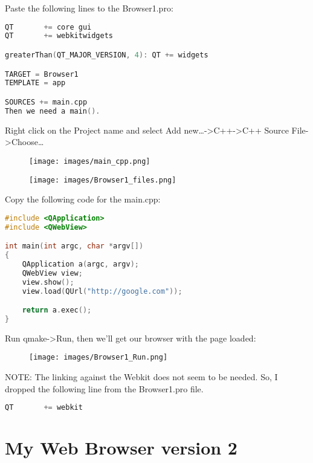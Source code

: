 Paste the following lines to the Browser1.pro:

\begin{lstlisting}[language=c++, numbers=none]
QT       += core gui
QT       += webkitwidgets

greaterThan(QT_MAJOR_VERSION, 4): QT += widgets

TARGET = Browser1
TEMPLATE = app

SOURCES += main.cpp
Then we need a main().
\end{lstlisting}

Right click on the Project name and select Add
new\ldots{}-\textgreater{}C++-\textgreater{}C++ Source
File-\textgreater{}Choose\ldots{}

\begin{figure}[htbp]
\centering
\texttt{[image: images/main\_cpp.png]}
\caption{}
\end{figure}

\begin{figure}[htbp]
\centering
\texttt{[image: images/Browser1\_files.png]}
\caption{}
\end{figure}

Copy the following code for the main.cpp:

\begin{lstlisting}[language=c++, numbers=none]
#include <QApplication>
#include <QWebView>

int main(int argc, char *argv[])
{
    QApplication a(argc, argv);
    QWebView view;
    view.show();
    view.load(QUrl("http://google.com"));

    return a.exec();
}
\end{lstlisting}

Run qmake-\textgreater{}Run, then we'll get our browser with the page
loaded:

\begin{figure}[htbp]
\centering
\texttt{[image: images/Browser1\_Run.png]}
\caption{}
\end{figure}

NOTE: The linking against the Webkit does not seem to be needed. So, I
dropped the following line from the Browser1.pro file.

\begin{lstlisting}[language=c++, numbers=none]
QT       += webkit
\end{lstlisting}

\section{My Web Browser version 2}\label{my-web-browser-version-2}

